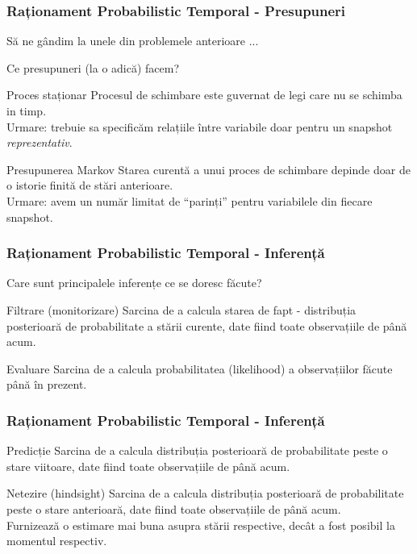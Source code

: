 \begin{frame}[t]
  \frametitle{Raționament Probabilistic Temporal - Presupuneri}
	Să ne gândim la unele din problemele anterioare ...	
	\vspace*{0.5em}
	\pause	
	
	Ce \alert{presupuneri} (la o adică) facem?
	\pause	
	
	\begin{block}{Proces staționar}
		Procesul de schimbare este guvernat de legi care \alert{nu se schimba in timp}.\\
		\alert{Urmare:} trebuie sa specificăm relațiile între variabile doar pentru un snapshot \emph{reprezentativ}.	
	\end{block}
	\pause	
	
	\begin{block}{Presupunerea Markov}
		Starea curentă a unui proces de schimbare depinde doar de o \alert{istorie finită} de stări anterioare.\\
		\alert{Urmare:} avem un număr \alert{limitat} de ``parinți'' pentru variabilele din fiecare snapshot.
	\end{block}
  
\end{frame}

\begin{frame}
  \frametitle{Raționament Probabilistic Temporal - Inferență}
	Care sunt principalele inferențe ce se doresc făcute?	
	\pause	
	
	\begin{block}{Filtrare (monitorizare)}
		Sarcina de a calcula \alert{starea de fapt} - distribuția posterioară de probabilitate a 
		\alert{stării curente}, date fiind toate observațiile de până acum.
	\end{block}
	\pause
	
	\begin{block}{Evaluare}
		Sarcina de a calcula \alert{probabilitatea (likelihood)} a observațiilor făcute până în prezent.
	\end{block}  
\end{frame}

\begin{frame}
  \frametitle{Raționament Probabilistic Temporal - Inferență}
	\begin{block}{Predicție}
		Sarcina de a calcula distribuția posterioară de probabilitate peste o \alert{stare viitoare}, 
		date fiind toate observațiile de până acum.
	\end{block}
	\pause
	
	\begin{block}{Netezire (hindsight)}
		Sarcina de a calcula distribuția posterioară de probabilitate peste o \alert{stare anterioară}, 
		date fiind toate observațiile de până acum.\\
		Furnizează o estimare mai buna asupra stării respective, decât a fost posibil la momentul respectiv.
	\end{block}
\end{frame}

